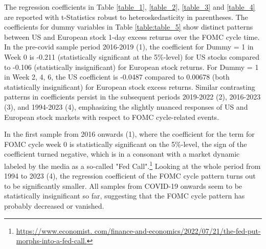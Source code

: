 The regression coefficients in Table \ref{table_1},  \ref{table_2},  \ref{table_3} and \ref{table_4} are reported with t-Statistics robust to heteroskedasticity in parentheses.
The coefficients for dummy variables in Table \ref{table:table_5} show distinct patterns between US and European stock 1-day excess returns over the FOMC cycle time.
In the pre-covid sample period 2016-2019 (1), the coefficient for Dummy = 1 in Week 0 is -0.211 (statistically significant at the 5\%-level) for US stocks compared to -0.106 (statistically insignificant) for European stock returns.
For Dummy = 1 in Week 2, 4, 6, the US coefficient is -0.0487 compared to 0.00678 (both statistically insignificant) for European stock excess returns.  Similar contrasting patterns in coefficients persist in the subsequent periods 2019-2022 (2), 2016-2023 (3), and 1994-2023 (4), emphasizing the slightly nuanced responses of US and European stock markets with respect to FOMC cycle-related events.


In the first sample from 2016 onwards (1), where the coefficient for the term for FOMC cycle week 0 is statistically significant on the 5\%-level, the sign of the coefficient turned negative, which is in a consonant with a market dynamic labeled by the media as a so-called "Fed Call".\footnote{\url{https://www.economist. com/finance-and-economics/2022/07/21/the-fed-put-morphs-into-a-fed-call.}} Looking at the whole period from 1994 to 2023 (4), the regression coefficient of the FOMC cycle pattern turns out to be significantly smaller.  All samples from COVID-19 onwards seem to be statistically insignificant so far, suggesting that the FOMC cycle pattern has probably decreased or vanished.




